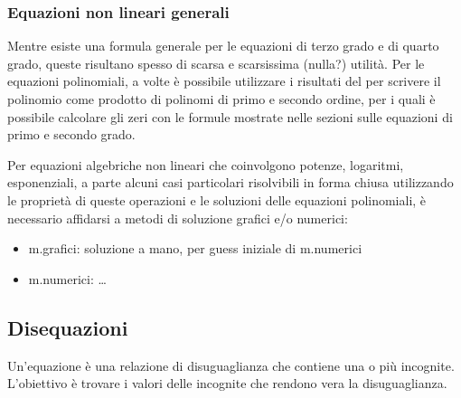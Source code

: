 \documentclass[letterpaper,10pt,italian]{jupyterBook}
\begin{document}
\subsubsection{Equazioni non lineari generali}
\label{\detokenize{ch/algebra/real-algebra:equazioni-non-lineari-generali}}\label{\detokenize{ch/algebra/real-algebra:math-hs-algebra-real-eq-nonlinear}}
\sphinxAtStartPar
Mentre esiste una formula generale per le equazioni di terzo grado e di quarto grado, queste risultano spesso di scarsa e scarsissima (nulla?) utilità. Per le equazioni polinomiali, a volte è possibile utilizzare i risultati del {\hyperref[\detokenize{ch/precalculus/polynomials:math-hs-precalculus-polynomials-alg-fund-thm}]{}} per scrivere il polinomio come prodotto di polinomi di primo e secondo ordine, per i quali è possibile calcolare gli zeri con le formule mostrate nelle sezioni sulle equazioni di primo e secondo grado.

\sphinxAtStartPar
Per equazioni algebriche non lineari che coinvolgono potenze, logaritmi, esponenziali, a parte alcuni casi particolari risolvibili in forma chiusa utilizzando le proprietà di queste operazioni e le soluzioni delle equazioni polinomiali, è necessario affidarsi a metodi di soluzione grafici e/o numerici: 
\begin{itemize}
\item {} 
\sphinxAtStartPar
m.grafici: soluzione a mano, per guess iniziale di m.numerici

\item {} 
\sphinxAtStartPar
m.numerici: …

\end{itemize}


\subsection{Disequazioni}
\label{\detokenize{ch/algebra/real-algebra:disequazioni}}
\sphinxAtStartPar
Un’equazione è una relazione di disuguaglianza che contiene una o più incognite. L’obiettivo è trovare i valori delle incognite che rendono vera la disuguaglianza.
\end{document}
